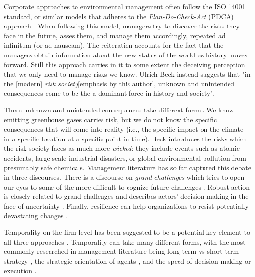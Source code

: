 Corporate approaches to environmental management often follow the ISO 14001 standard, or similar models that adheres to the \textit{Plan-Do-Check-Act} (PDCA) approach \citep{ISO2015}. When following this model, managers try to discover the risks they face in the future, asses them, and manage them accordingly, repeated ad infinitum (or ad nauseam). The reiteration accounts for the fact that the managers obtain information about the new status of the world as history moves forward. Still this approach carries in it to some extent the deceiving perception that we only need to manage risks we know. Ulrich Beck instead suggests that "in the [modern] \textit{risk society}[emphasis by this author], unknown and unintended consequences come to be the a dominant force in history and society"\citep[p. 22]{Beck1992}.

These unknown and unintended consequences take different forms. We know emitting greenhouse gases carries risk, but we do not know the specific consequences that will come into reality (i.e., the specific impact on the climate in a specific location at a specific point in time). Beck introduces the risks which the risk society faces as much more \textit{wicked}: they include events such as atomic accidents, large-scale industrial disasters, or global environmental pollution from presumably safe chemicals. Management literature has so far captured this debate in three discourses. There is a discourse on \textit{grand challenges} which tries to open our eyes to some of the more difficult to cognize future challenges \citep{George2016, Howard-Grenville2014}. Robust action is closely related to grand challenges and describes actors' decision making in the face of uncertainty \citep{Ferraro2015}. Finally, resilience can help organizations to resist potentially devastating changes \citep{VanderVegt2015, Flammer2017}.

Temporality on the firm level has been suggested to be a potential key element to all three approaches \citep{Bansal2014, Bansal2019, Kunisch2017}. Temporality can take many different forms, with the most commonly researched in management literature being long-term vs short-term strategy \citep{Flammer2017, Slawinski2015, Wang2012}, the strategic orientation of agents \citep{Souder2012, Wowak2015, Souder2010, Chen2017}, and the speed of decision making or execution \citep{Baum2003, Kownatzki2013, Dykes2019}. 

